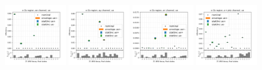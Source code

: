 \begin{figure}
    \includegraphics[width=0.24\textwidth]{appendices/ttSystReweighting/figures/afterCorr/icata2_ch0_ue.png}
    \includegraphics[width=0.24\textwidth]{appendices/ttSystReweighting/figures/afterCorr/icata2_ch1_ue.png}
    \includegraphics[width=0.24\textwidth]{appendices/ttSystReweighting/figures/afterCorr/icata2_ch2_ue.png}
    \includegraphics[width=0.24\textwidth]{appendices/ttSystReweighting/figures/afterCorr/icata2_ch3_ue.png}


\end{figure}
